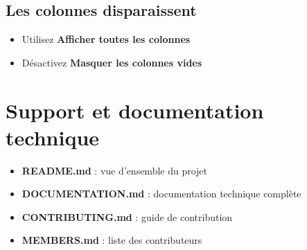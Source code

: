 \documentclass[11pt, a4paper]{article}
\begin{document}
\subsection{Les colonnes disparaissent}
\begin{itemize}
    \item Utilisez \textbf{Afficher toutes les colonnes}
    \item Désactivez \textbf{Masquer les colonnes vides}
\end{itemize}

\section{Support et documentation technique}
\begin{itemize}
    \item \textbf{README.md} : vue d'ensemble du projet
    \item \textbf{DOCUMENTATION.md} : documentation technique complète
    \item \textbf{CONTRIBUTING.md} : guide de contribution
    \item \textbf{MEMBERS.md} : liste des contributeurs
\end{itemize}
\end{document}
